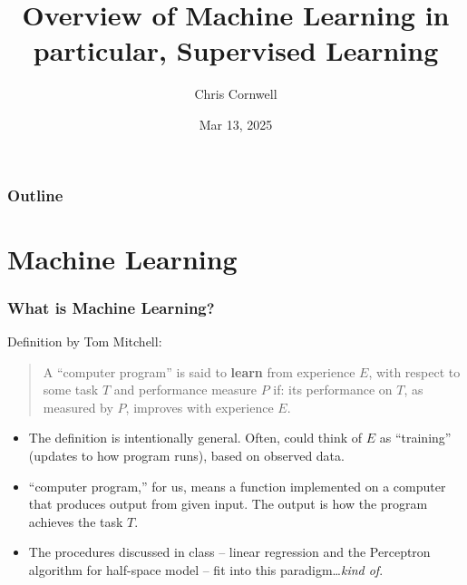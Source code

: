 \documentclass{beamer}
\author{Chris Cornwell}
\date{Mar 13, 2025}
\title{Overview of Machine Learning \newline 
    \footnotesize{in particular, Supervised Learning}}
\theoremstyle{example}
\begin{document}
\begin{frame}
\titlepage
\end{frame}

\begin{frame}
\frametitle{Outline}
\tableofcontents
\end{frame}

\section{Machine Learning}

\begin{frame}
\frametitle{What is Machine Learning?}
    Definition by Tom Mitchell:\newline 
    \begin{quote}
        A ``computer program'' is said to \textbf{learn} from experience $E$, with respect to some task $T$ and performance measure $P$ if: its performance on $T$, as measured by $P$, improves with experience $E$.
    \end{quote}
    \begin{itemize}
        \item The definition is intentionally general. Often, could think of $E$ as ``training'' (updates to how program runs), based on observed data.
        \item ``computer program,'' for us, means a function implemented on a computer that produces output from given input. The output is how the program achieves the task $T$. 
        \item The procedures discussed in class {--} linear regression and the Perceptron algorithm for half-space model {--} fit into this paradigm\ldots \textit{kind of}.
    \end{itemize}

\end{frame}
\end{document}
